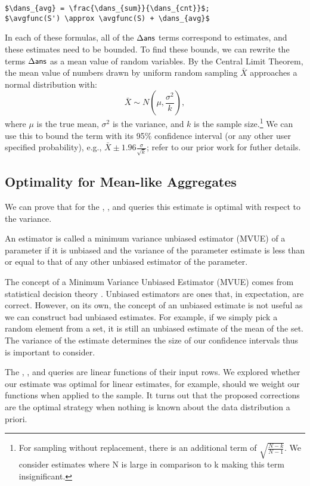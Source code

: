 \begin{lstlisting}[mathescape,basicstyle={\scriptsize}]
$\dans_{avg} = \frac{\dans_{sum}}{\dans_{cnt}}$;
$\avgfunc(S') \approx \avgfunc(S) + \dans_{avg}$
\end{lstlisting}

In each of these formulas, all of the $\Delta\textsf{ans}$ terms correspond to estimates, and these estimates need to be bounded.
To find these bounds, we can rewrite the terms $\Delta\textsf{ans}$ as a mean value of random variables.
By the Central Limit Theorem, the mean value of numbers drawn by uniform random sampling $\bar{X}$ approaches a normal distribution with:
\[
\bar{X} \sim N(\mu,\frac{\sigma^2}{k}),
\]
where $\mu$ is the true mean, $\sigma^2$ is the variance, and $k$ is the sample size.\footnote{\scriptsize For sampling without replacement, there is an additional term of $\sqrt{\frac{N-k}{N-1}}$. We consider estimates where N is large in comparison to k making this term insignificant.}
We can use this to bound the term with its 95\% confidence interval (or any other user specified probability), e.g., $\bar{X} \pm 1.96 \frac{\sigma}{\sqrt{k}}$; refer to our prior work \cite{wang1999sample} for futher details.

\subsection{Optimality for Mean-like Aggregates}
We can prove that for the \sumfunc, \countfunc, and \avgfunc queries this estimate is optimal with respect to the variance.
\begin{proposition}
An estimator is called a minimum variance unbiased estimator (MVUE) of a parameter if it is unbiased and the variance of the parameter estimate is less than or equal to that of any other unbiased estimator of the parameter.
\end{proposition}
The concept of a Minimum Variance Unbiased Estimator (MVUE) comes from statistical decision theory \cite{cox1979theoretical}.
Unbiased estimators are ones that, in expectation, are correct.
However, on its own, the concept of an unbiased estimate is not useful as we can construct bad unbiased estimates.
For example, if we simply pick a random element from a set, it is still an unbiased estimate of the mean of the set.
The variance of the estimate determines the size of our confidence intervals thus is important to consider.

The \sumfunc, \countfunc, and \avgfunc queries are linear functions of their input rows.
We explored whether our estimate was optimal for linear estimates, for example, should we weight our functions when applied to the sample.
It turns out that the proposed corrections are the optimal strategy when nothing is known about the data distribution a priori.


